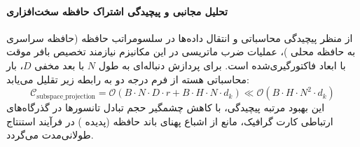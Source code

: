 \paragraph{تحلیل مجانبی و پیچیدگی اشتراک حافظه سخت‌افزاری}
از منظر پیچیدگی محاسباتی و انتقال داده‌ها در سلسومراتب حافظه (حافظه سراسری  به حافظه محلی )، عملیات ضرب ماتریسی در این مکانیزم نیازمند تخصیص بافر موقت با ابعاد فاکتورگیری‌شده است. برای پردازش دنباله‌ای به طول $N$ با بعد مخفی $D$، بار محاسباتی هسته از فرم درجه دو به رابطه زیر تقلیل می‌یابد:
\begin{equation}
\label{eq:complexity_subspace_projection}
\mathcal{C}_{\text{subspace\_projection}} = \mathcal{O}\left( B \cdot N \cdot D \cdot r + B \cdot H \cdot N \cdot d_k \right) \ll \mathcal{O}\left( B \cdot H \cdot N^2 \cdot d_k \right)
\end{equation}
این بهبود مرتبه پیچیدگی، با کاهش چشمگیر حجم تبادل تانسورها در گذرگاه‌های ارتباطی کارت گرافیک، مانع از اشباع پهنای باند حافظه (پدیده ) در فرآیند استنتاج طولانی‌مدت می‌گردد.
